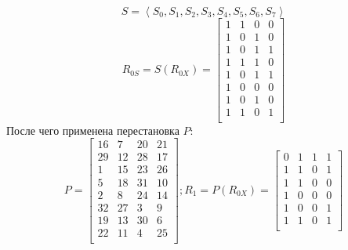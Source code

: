 \documentclass[a4paper, 14pt]{extarticle}
\begin{document}
\begin{enumerate}
\begin{equation}
\begin{array}{c}
        \end{array}
    \end{equation}
    \begin{equation}
        S = \left\langle S_0, S_1, S_2, S_3, S_4, S_5, S_6, S_7 \right\rangle 
    \end{equation}
    \begin{equation}
        R_{0S} = S(R_{0X}) = \begin{bmatrix}
            1   & 1   & 0   & 0   \\
            1   & 0   & 1   & 0   \\
            1   & 0   & 1   & 1   \\
            1   & 1   & 1   & 0   \\
            1   & 0   & 1   & 1   \\
            1   & 0   & 0   & 0   \\
            1   & 0   & 1   & 0   \\
            1   & 1   & 0   & 1   \\
        \end{bmatrix}
    \end{equation}
    После чего применена перестановка $P$:
    \begin{equation}\label{eq:finish}
        P = \begin{bmatrix}
            16  & 7   & 20  & 21  \\
            29  & 12  & 28  & 17  \\
            1   & 15  & 23  & 26  \\
            5   & 18  & 31  & 10  \\
            2   & 8   & 24  & 14  \\
            32  & 27  & 3   & 9   \\
            19  & 13  & 30  & 6   \\
            22  & 11  & 4   & 25  \\
        \end{bmatrix};
        R_1 = P(R_{0X}) = \begin{bmatrix}
            0   & 1   & 1   & 1   \\
            1   & 1   & 0   & 1   \\
            1   & 1   & 0   & 0   \\
            1   & 0   & 0   & 0   \\
            1   & 0   & 0   & 1   \\
            1   & 1   & 0   & 1   \\

\end{bmatrix}
\end{equation}
\end{enumerate}
\end{document}
